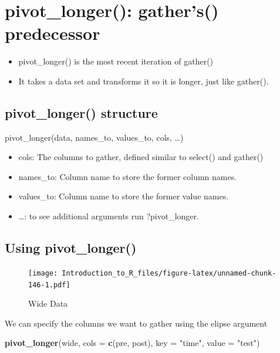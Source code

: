\documentclass[]{book}
\newenvironment{Shaded}{\begin{snugshade}}{\end{snugshade}}
\newcommand{\DataTypeTok}[1]{\textcolor[rgb]{0.13,0.29,0.53}{#1}}
\newcommand{\KeywordTok}[1]{\textcolor[rgb]{0.13,0.29,0.53}{\textbf{#1}}}
\newcommand{\NormalTok}[1]{#1}
\newcommand{\StringTok}[1]{\textcolor[rgb]{0.31,0.60,0.02}{#1}}
\providecommand{\tightlist}{%
  \setlength{\itemsep}{0pt}\setlength{\parskip}{0pt}}
\theoremstyle{definition}
\theoremstyle{definition}
\theoremstyle{definition}
\theoremstyle{remark}
\let\BeginKnitrBlock\begin \let\EndKnitrBlock\end
\begin{document}
\hypertarget{pivot_longer-gathers-predecessor}{%
\section{pivot\_longer(): gather's() predecessor}\label{pivot_longer-gathers-predecessor}}

\begin{itemize}
\tightlist
\item
  pivot\_longer() is the most recent iteration of gather()
\item
  It takes a data set and transforms it so it is longer, just like gather().
\end{itemize}

\hypertarget{pivot_longer-structure}{%
\subsection{pivot\_longer() structure}\label{pivot_longer-structure}}

pivot\_longer(data, names\_to, values\_to, cols, \ldots{})

\begin{itemize}
\tightlist
\item
  cols: The columns to gather, defined similar to select() and gather()
\item
  names\_to: Column name to store the former column names.
\item
  values\_to: Column name to store the former value names.
\item
  \ldots{}: to see additional arguments run ?pivot\_longer.
\end{itemize}

\hypertarget{using-pivot_longer}{%
\subsection{Using pivot\_longer()}\label{using-pivot_longer}}

\begin{figure}
\centering
\texttt{[image: Introduction\_to\_R\_files/figure-latex/unnamed-chunk-146-1.pdf]}
\caption{\label{fig:unnamed-chunk-146}Wide Data}
\end{figure}

\BeginKnitrBlock{example}
\protect\hypertarget{exm:pivotlonger}{}{\label{exm:pivotlonger} }We can specify the columns we want to gather using the elipse argument
\EndKnitrBlock{example}

\begin{Shaded}
\begin{Highlighting}[]
\KeywordTok{pivot_longer}\NormalTok{(wide, }\DataTypeTok{cols =} \KeywordTok{c}\NormalTok{(pre, post), }\DataTypeTok{key =} \StringTok{"time"}\NormalTok{, }\DataTypeTok{value =} \StringTok{"test"}\NormalTok{)}
\end{Highlighting}
\end{Shaded}
\end{document}
